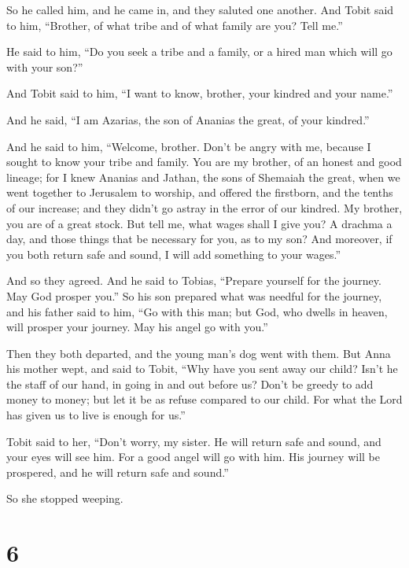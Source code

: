  So he called him, and he came in, and they saluted one
another.  And Tobit said to him, ``Brother, of what tribe
and of what family are you? Tell me.''

 He said to him, ``Do you seek a tribe and a family, or a
hired man which will go with your son?''

And Tobit said to him, ``I want to know, brother, your kindred and your
name.''

 And he said, ``I am Azarias, the son of Ananias the great,
of your kindred.''

 And he said to him, ``Welcome, brother. Don't be angry
with me, because I sought to know your tribe and family. You are my
brother, of an honest and good lineage; for I knew Ananias and Jathan,
the sons of Shemaiah the great, when we went together to Jerusalem to
worship, and offered the firstborn, and the tenths of our increase; and
they didn't go astray in the error of our kindred. My brother, you are
of a great stock.  But tell me, what wages shall I give
you? A drachma a day, and those things that be necessary for you, as to
my son?  And moreover, if you both return safe and sound, I
will add something to your wages.''

 And so they agreed. And he said to Tobias, ``Prepare
yourself for the journey. May God prosper you.'' So his son prepared
what was needful for the journey, and his father said to him, ``Go with
this man; but God, who dwells in heaven, will prosper your journey. May
his angel go with you.''

Then they both departed, and the young man's dog went with them.
 But Anna his mother wept, and said to Tobit, ``Why have
you sent away our child? Isn't he the staff of our hand, in going in and
out before us?  Don't be greedy to add money to money; but
let it be as refuse compared to our child.  For what the
Lord has given us to live is enough for us.''

 Tobit said to her, ``Don't worry, my sister. He will
return safe and sound, and your eyes will see him.  For a
good angel will go with him. His journey will be prospered, and he will
return safe and sound.''

 So she stopped weeping.

\hypertarget{section-5}{%
\section{6}\label{section-5}}

